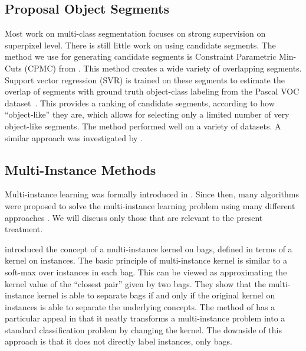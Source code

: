 \subsection{Proposal Object Segments}\label{related_segments}
Most work on multi-class segmentation focuses on strong supervision on superpixel level. There is still little work on using candidate segments.
The method we use for generating candidate segments is Constraint Parametric Min-Cuts (CPMC) from \citet{carreira2010constrained}.
This method creates a wide variety of overlapping segments. Support vector regression (SVR) is trained on these segments
to estimate the overlap of segments with ground truth object-class labeling
from the Pascal VOC dataset~\citep{pascal}. This provides a ranking of candidate segments, according to how ``object-like'' they are, which
allows for selecting only a limited number of very object-like segments.
The method performed well on a variety of datasets.
A similar approach was investigated by \citet{endres2010category}.

\subsection{Multi-Instance Methods}
Multi-instance learning was formally introduced in \citet{dietterich1997solving}.
Since then, many algorithms were proposed to solve the multi-instance learning problem
using many different approaches \citep{andrews2003support,gaertner2002multi,zhou2009multi,li2009convex,zhang2002dd,mangasarian2008multiple,leistner2010miforests,chen2006miles}.
We will discuss only those that are relevant to the present treatment.

\citet{gaertner2002multi} introduced the concept of a multi-instance
kernel on bags, defined in terms of a kernel on instances. 
The basic principle of multi-instance kernel is similar to a soft-max over instances in
each bag. This can be viewed as approximating the kernel value of the ``closest pair'' given by two bags. They show that the multi-instance kernel
is able to separate bags if and only if the original kernel on instances is able to separate the underlying concepts.
The method of \citet{gaertner2002multi} has a particular appeal in that it neatly transforms a multi-instance problem into a standard
classification problem by changing the kernel. The downside of this approach is that it does
not directly label instances, only bags.

